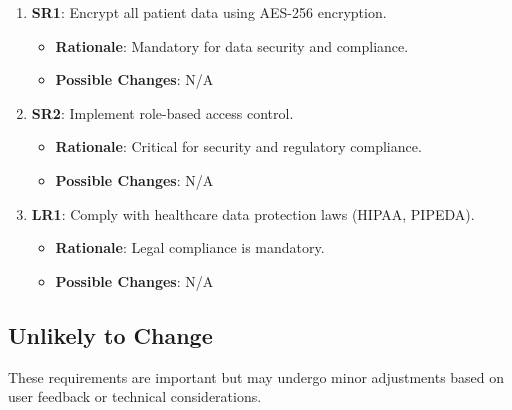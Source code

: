 \documentclass[12pt]{article}
\begin{document}
\begin{enumerate}
    \item \textbf{SR1}: Encrypt all patient data using AES-256 encryption.
    \begin{itemize}[label=-]
        \item \textbf{Rationale}: Mandatory for data security and compliance.
        \item \textbf{Possible Changes}: N/A
    \end{itemize}

    \item \textbf{SR2}: Implement role-based access control.
    \begin{itemize}[label=-]
        \item \textbf{Rationale}: Critical for security and regulatory compliance.
        \item \textbf{Possible Changes}: N/A
    \end{itemize}

    \item \textbf{LR1}: Comply with healthcare data protection laws (HIPAA, PIPEDA).
    \begin{itemize}[label=-]
        \item \textbf{Rationale}: Legal compliance is mandatory.
        \item \textbf{Possible Changes}: N/A
    \end{itemize}
\end{enumerate}

\subsection{Unlikely to Change}

These requirements are important but may undergo minor adjustments based on user feedback or technical considerations.
\end{document}
